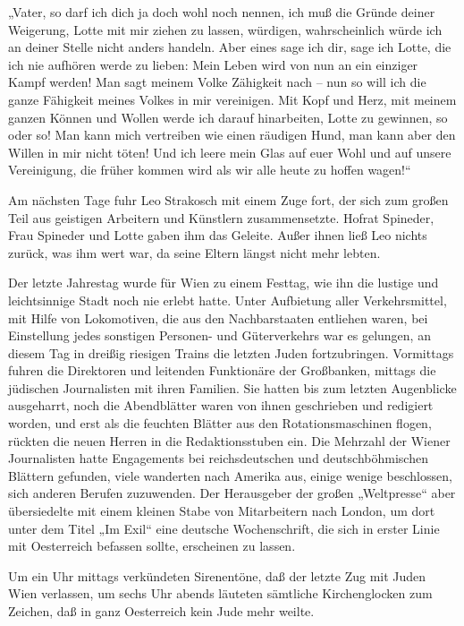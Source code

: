 „Vater, so darf ich dich ja doch wohl noch nennen, ich muß die
Gründe deiner Weigerung, Lotte mit mir ziehen zu lassen, würdigen,
wahrscheinlich würde ich an deiner Stelle nicht anders handeln.
Aber eines sage ich dir, sage ich Lotte, die ich nie aufhören werde
zu lieben: Mein Leben wird von nun an ein einziger Kampf werden!
Man sagt meinem Volke Zähigkeit nach – nun so will ich die ganze
Fähigkeit meines Volkes in mir vereinigen. Mit Kopf und Herz, mit
meinem ganzen Können und Wollen werde ich darauf hinarbeiten, Lotte
zu gewinnen, so oder so! Man kann mich vertreiben wie einen
räudigen Hund, man kann aber den Willen in mir nicht töten! Und ich
leere mein Glas auf euer Wohl und auf unsere Vereinigung, die
früher kommen wird als wir alle heute zu hoffen wagen!“

Am nächsten Tage fuhr Leo Strakosch mit einem Zuge fort, der sich
zum großen Teil aus geistigen Arbeitern und Künstlern
zusammensetzte. Hofrat Spineder, Frau Spineder und Lotte gaben ihm
das Geleite. Außer ihnen ließ Leo nichts zurück, was ihm wert war,
da seine Eltern längst nicht mehr lebten.

\tb{* * *}
Der letzte Jahrestag wurde für Wien zu einem
Festtag, wie ihn die lustige und leichtsinnige Stadt noch nie
erlebt hatte. Unter Aufbietung aller Verkehrsmittel, mit Hilfe von
Lokomotiven, die aus den Nachbarstaaten entliehen waren, bei
Einstellung jedes sonstigen Personen- und Güterverkehrs war es
gelungen, an diesem Tag in dreißig riesigen Trains die letzten
Juden fortzubringen. Vormittags fuhren die Direktoren und leitenden
Funktionäre der Großbanken, mittags die jüdischen Journalisten mit
ihren Familien. Sie hatten bis zum letzten Augenblicke ausgeharrt,
noch die Abendblätter waren von ihnen geschrieben und redigiert
worden, und erst als die feuchten Blätter aus den
Rotationsmaschinen flogen, rückten die neuen Herren in die
Redaktionsstuben ein. Die Mehrzahl der Wiener Journalisten hatte
Engagements bei reichsdeutschen und deutschböhmischen Blättern
gefunden, viele wanderten nach Amerika aus, einige wenige
beschlossen, sich anderen Berufen zuzuwenden. Der Herausgeber der
großen „Weltpresse“ aber übersiedelte mit einem kleinen Stabe von
Mitarbeitern nach London, um dort unter dem Titel „Im Exil“ eine
deutsche Wochenschrift, die sich in erster Linie mit Oesterreich
befassen sollte, erscheinen zu lassen.

Um ein Uhr mittags verkündeten Sirenentöne, daß der letzte Zug mit
Juden Wien verlassen, um sechs Uhr abends läuteten sämtliche
Kirchenglocken zum Zeichen, daß in ganz Oesterreich kein Jude mehr
weilte.

